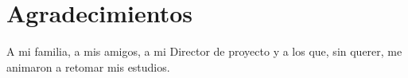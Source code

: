 
\chapter*{Agradecimientos}
\begin{center}
\thispagestyle{empty}
\par\end{center}

A mi familia, a mis amigos, a mi Director de proyecto y a los que, sin querer, me animaron a retomar mis estudios.



